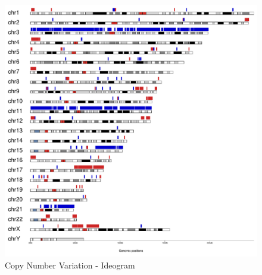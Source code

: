 \documentclass[woside,a4paper,12pt]{article}\usepackage[]{graphicx}\usepackage[]{color}
\begin{document}
\begin{figure}[H]
\centering
\includegraphics[width=\textwidth]{somaticGermline_TCRBOA6_VCRome_CNV_Plot_Ideogram_2019-02-08.pdf}
\caption{Copy Number Variation - Ideogram}
\label{fig:12}
\end{figure}
\end{document}
